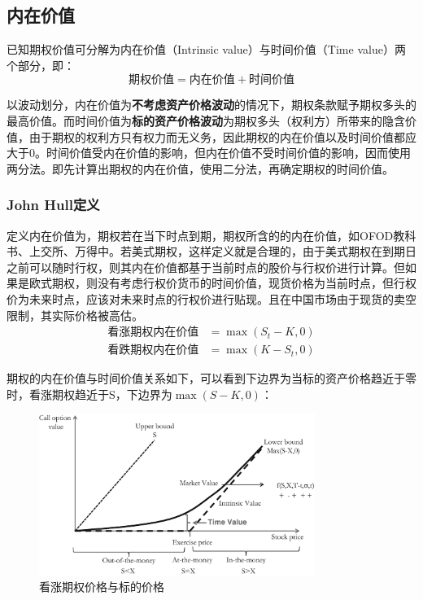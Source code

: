 \documentclass[11pt]{article}
\begin{document}
\subsection{内在价值}

已知期权价值可分解为内在价值（Intrinsic value）与时间价值（Time value）两个部分，即：
\begin{equation*}
    \boxed{
        \text{期权价值} = \text{内在价值} + \text{时间价值}
    }
\end{equation*}

以波动划分，内在价值为\textbf{不考虑资产价格波动}的情况下，期权条款赋予期权多头的最高价值。而时间价值为\textbf{标的资产价格波动}为期权多头（权利方）所带来的隐含价值，由于期权的权利方只有权力而无义务，因此期权的内在价值以及时间价值都应大于0。时间价值受内在价值的影响，但内在价值不受时间价值的影响，因而使用两分法。即先计算出期权的内在价值，使用二分法，再确定期权的时间价值。

\subsubsection{John Hull定义}

定义内在价值为，期权若在当下时点到期，期权所含的的内在价值，如OFOD教科书、上交所、万得中。若美式期权，这样定义就是合理的，由于美式期权在到期日之前可以随时行权，则其内在价值都基于当前时点的股价与行权价进行计算。但如果是欧式期权，则没有考虑行权价货币的时间价值，现货价格为当前时点，但行权价为未来时点，应该对未来时点的行权价进行贴现。且在中国市场由于现货的卖空限制，其实际价格被高估。
\noindent\begin{align*}
    \text{看涨期权内在价值} & = \max(S_t-K,0) \\
    \text{看跌期权内在价值} & = \max(K-S_t,0)
\end{align*}

期权的内在价值与时间价值关系如下，可以看到下边界为当标的资产价格趋近于零时，看涨期权趋近于S，下边界为$\max(S-K,0)$：
\begin{figure}[H]
    \centering
    \includegraphics[width=0.8\textwidth]{fig/call_vs_stock.png}
    \caption{看涨期权价格与标的价格}
    \label{fig:call_vs_stock}
\end{figure}
\end{document}
